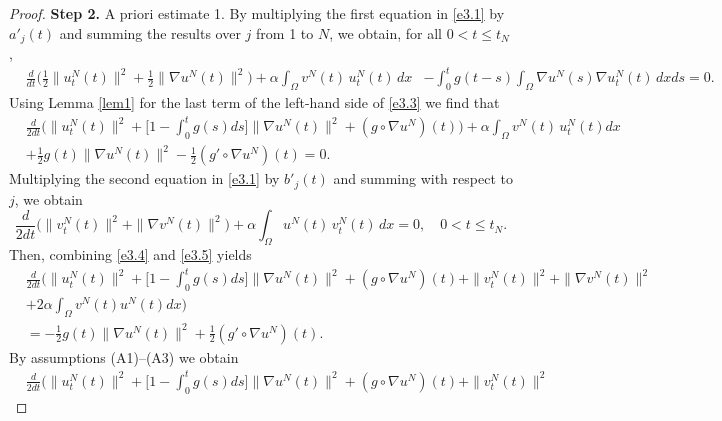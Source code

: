 \documentclass[11pt]{article}
\numberwithin{equation}{section}
\begin{document}
\begin{proof}
\noindent\textbf{Step 2.} A priori estimate 1.
By multiplying the first equation in \eqref{e3.1} by \(a'_j(t)\) and summing the results over \(j\)
from 1 to \(N\), we obtain, for all \(0 < t \leq t_N\),
\begin{equation}
\begin{aligned}
&\frac{d}{dt} \Big( \frac{1}{2} \| u^N_{t}(t) \|^2 + \frac{1}{2} \| \nabla u^N(t) \|^2 \Big)
+ \alpha \int_{\Omega} v^N(t) \, u^N_{t}(t) \, dx
&- \int_0^t g(t-s) \int_{\Omega} \nabla u^N(s) \nabla u^N_{t}(t) \, dx ds =0.
\end{aligned}\label{e3.3}
\end{equation}
Using Lemma \ref{lem1} for the last term of the left-hand side of \eqref{e3.3}
we find that
\begin{equation}
\begin{aligned}
&\frac{d}{2dt} \Big( \| u^N_{t}(t) \|^2
+ \Big[ 1-\int_0^t g(s) ds \Big] \| \nabla u^N(t) \|^2 + (g\circ \nabla u^N)(t) \Big)
+\alpha \int_{\Omega} v^N(t) \, u^N_{t}(t) dx \\
& +\frac{1}{2} g(t)\parallel \nabla u^N(t) \parallel^2 - \frac{1}{2}( g'\circ\nabla u^N) (t) =0.
\end{aligned} \label{e3.4}
 \end{equation}
Multiplying the second equation in \eqref{e3.1} by $b'_j(t)$ and summing with respect to $j$, we obtain
 \begin{equation}
 \frac{d}{2 dt} \Big( \| v^N_{t}(t) \|^2 + \| \nabla v^N (t) \|^2 \Big)
 + \alpha \int_{\Omega} u^N(t) \, v^N_{t}(t) \, dx =0, \quad 0 < t \leq t_N.
 \label{e3.5}
\end{equation}
Then, combining \eqref{e3.4} and \eqref{e3.5} yields
\begin{equation}
\begin{aligned}
 &\frac{d}{2 dt} \Big( \| u^N_{t}(t) \|^2 + \Big[ 1-\int_0^t g(s)ds\Big]
 \| \nabla u^N(t) \|^2 +(g\circ\nabla u^N)(t)+\| v^N_{t}(t) \|^2 + \| \nabla v^N(t) \|^2 \\
 &+ 2 \alpha \int_{\Omega} v^N(t) u^N(t) dx\Big) \\
&=-\frac{1}{2} g(t)\parallel \nabla u^N(t) \parallel^2 + \frac{1}{2}( g'\circ\nabla u^N )(t).
\end{aligned}\label{e3.6}
\end{equation}
By assumptions (A1)--(A3) we obtain
 \begin{equation}
\begin{aligned}
&\frac{d}{2 dt} \Big( \| u^N_{t} (t) \|^2 + \Big[ 1-\int_0^t g(s)ds\Big]
 \| \nabla u^N(t) \|^2 +(g\circ\nabla u^N)(t)+\| v^N_{t}(t) \|^2

\end{aligned}
\end{equation}
\end{proof}
\end{document}
